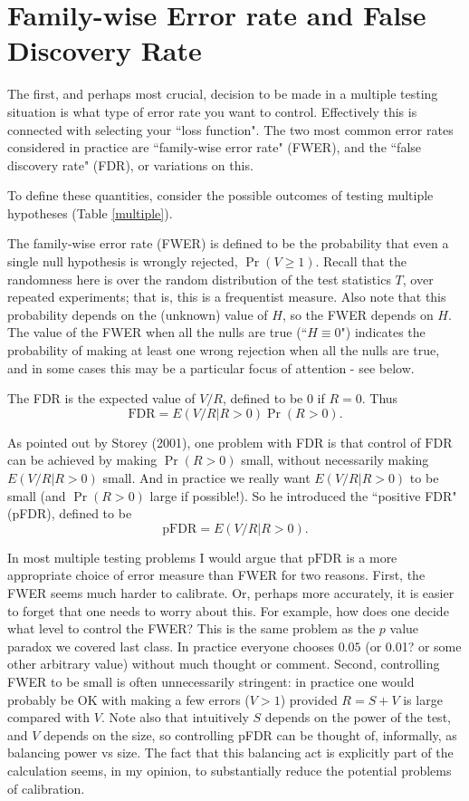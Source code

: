 \documentclass[times,11pt]{article}
\def\FDR{\text{FDR}}
\def\pFDR{\text{pFDR}}
\begin{document}
\section{Family-wise Error rate and False Discovery Rate}

The first, and perhaps most crucial, decision to be made in a multiple testing situation is what type of error rate you want to control. Effectively this is connected with selecting your ``loss function".
The two most common error rates considered in practice are ``family-wise error rate" (FWER), and
the ``false discovery rate" (FDR), or variations on this.

To define these quantities, consider the possible outcomes of testing multiple hypotheses (Table \ref{multiple}).
 
The family-wise error rate (FWER) is defined to be
the probability that even a single null hypothesis is wrongly rejected, $\Pr(V \geq 1)$.  Recall that the randomness here is over the random distribution of the test statistics $T$, over repeated experiments; that is, this is a frequentist measure. Also note that this probability depends on the (unknown) value of $H$, so the FWER depends on $H$. The value of the FWER when all the nulls are true (``$H \equiv 0$") indicates
the probability of making at least one wrong rejection when all the nulls are true, and in some cases this may be a particular focus of attention - see below.

The FDR is the expected value of $V/R$, defined to be 0 if $R=0$. Thus
\begin{equation}
\FDR = E(V/R | R>0) \Pr(R>0).
\end{equation}

As pointed out by Storey (2001), one problem with FDR is that control of $\FDR$ can be achieved by making $\Pr(R>0)$ small, without necessarily making $E(V/R | R>0)$ small. And in practice we
really want $E(V/R | R>0)$ to be small (and $\Pr(R>0)$ large if possible!). So he introduced the
``positive FDR" (pFDR), defined to be
\begin{equation}
\pFDR = E(V/R | R>0).
\end{equation}

In most multiple testing problems I would argue that $\pFDR$ is a more appropriate choice of error measure than FWER for two reasons. First, 
the FWER seems much harder to calibrate. Or, perhaps more accurately, it is easier to forget that
one needs to worry about this. For example, how
does one decide what level to control the FWER? This is the same problem as the $p$ value paradox we covered last class.  In practice everyone chooses $0.05$ (or 0.01? or some other arbitrary value) without much thought or comment. 
Second,
controlling FWER to be small is often unnecessarily stringent: in practice one would probably be OK with making a few errors ($V>1$) provided $R=S+V$ is large compared with $V$. Note also that intuitively $S$ depends on the power of the test, and $V$ depends on the size, so controlling pFDR can be thought of, informally, as balancing power vs size.
The fact that this balancing act is explicitly part
of the calculation seems, in my opinion, to substantially reduce
the potential problems of calibration.
\end{document}
